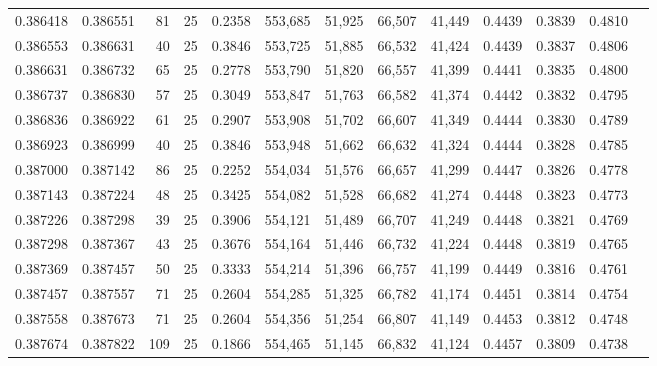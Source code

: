 \begin{tabular}{rrrrrrrrrrrrr}
0.386418 & 0.386551 &    81 &  25 &                                     0.2358 & 553,685 &  51,925 &  66,507 &  41,449 & 0.4439 & 0.3839 & 0.4810 \\
0.386553 & 0.386631 &    40 &  25 &                                     0.3846 & 553,725 &  51,885 &  66,532 &  41,424 & 0.4439 & 0.3837 & 0.4806 \\
0.386631 & 0.386732 &    65 &  25 &                                     0.2778 & 553,790 &  51,820 &  66,557 &  41,399 & 0.4441 & 0.3835 & 0.4800 \\
0.386737 & 0.386830 &    57 &  25 &                                     0.3049 & 553,847 &  51,763 &  66,582 &  41,374 & 0.4442 & 0.3832 & 0.4795 \\
0.386836 & 0.386922 &    61 &  25 &                                     0.2907 & 553,908 &  51,702 &  66,607 &  41,349 & 0.4444 & 0.3830 & 0.4789 \\
0.386923 & 0.386999 &    40 &  25 &                                     0.3846 & 553,948 &  51,662 &  66,632 &  41,324 & 0.4444 & 0.3828 & 0.4785 \\
0.387000 & 0.387142 &    86 &  25 &                                     0.2252 & 554,034 &  51,576 &  66,657 &  41,299 & 0.4447 & 0.3826 & 0.4778 \\
0.387143 & 0.387224 &    48 &  25 &                                     0.3425 & 554,082 &  51,528 &  66,682 &  41,274 & 0.4448 & 0.3823 & 0.4773 \\
0.387226 & 0.387298 &    39 &  25 &                                     0.3906 & 554,121 &  51,489 &  66,707 &  41,249 & 0.4448 & 0.3821 & 0.4769 \\
0.387298 & 0.387367 &    43 &  25 &                                     0.3676 & 554,164 &  51,446 &  66,732 &  41,224 & 0.4448 & 0.3819 & 0.4765 \\
0.387369 & 0.387457 &    50 &  25 &                                     0.3333 & 554,214 &  51,396 &  66,757 &  41,199 & 0.4449 & 0.3816 & 0.4761 \\
0.387457 & 0.387557 &    71 &  25 &                                     0.2604 & 554,285 &  51,325 &  66,782 &  41,174 & 0.4451 & 0.3814 & 0.4754 \\
0.387558 & 0.387673 &    71 &  25 &                                     0.2604 & 554,356 &  51,254 &  66,807 &  41,149 & 0.4453 & 0.3812 & 0.4748 \\
0.387674 & 0.387822 &   109 &  25 &                                     0.1866 & 554,465 &  51,145 &  66,832 &  41,124 & 0.4457 & 0.3809 & 0.4738 \\

\end{tabular}
